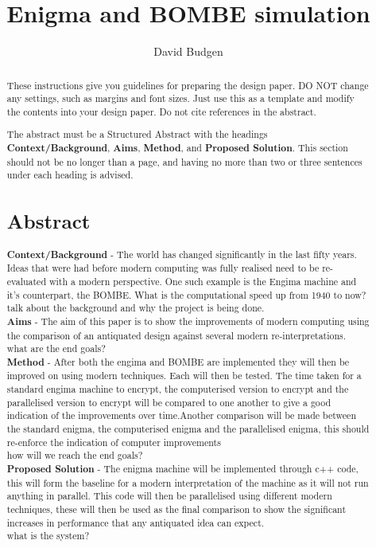 \documentclass[12pt,a4paper]{article}
\title{Enigma and BOMBE simulation}
\author{David Budgen}
\date{}
\begin{document}
\maketitle

\begin{abstract}
These instructions give you guidelines for preparing the design paper.  DO NOT change any settings, such as margins and font sizes.  Just use this as a template and modify the contents into your design paper.  Do not cite references in the abstract.

The abstract must be a Structured Abstract with the headings {\bf Context/Background}, {\bf Aims}, {\bf Method}, and {\bf Proposed Solution}.  This section should not be no longer than a page, and having no more than two or three sentences under each heading is advised.
\\
\section{Abstract}

{\bf Context/Background} - The world has changed significantly in the last fifty years. Ideas that were had before modern computing was fully realised need to be re-evaluated with a modern perspective. One such example is the Engima machine and it's counterpart, the BOMBE. What is the computational speed up from 1940 to now?\\
talk about the background and why the project is being done.\\

{\bf Aims} - The aim of this paper is to show the improvements of modern computing using the comparison of an antiquated design against several modern re-interpretations.\\
what are the end goals?\\

{\bf Method} - After both the engima and BOMBE are implemented they will then be improved on using modern techniques. Each will then be tested. The time taken for a standard engima machine to encrypt, the computerised version to encrypt and the parallelised version to encrypt will be compared to one another to give a good indication of the improvements over time.Another comparison will be made between the standard enigma, the computerised enigma and the parallelised enigma, this should re-enforce the indication of computer improvements\\
how will we reach the end goals?\\

{\bf Proposed Solution} - The enigma machine will be implemented through c++ code, this will form the baseline for a modern interpretation of the machine as it will not run anything in parallel. This code will then be parallelised using different modern techniques, these will then be used as the final comparison to show the significant increases in performance that any antiquated idea can expect.\\
what is the system?
\end{abstract}
\end{document}

